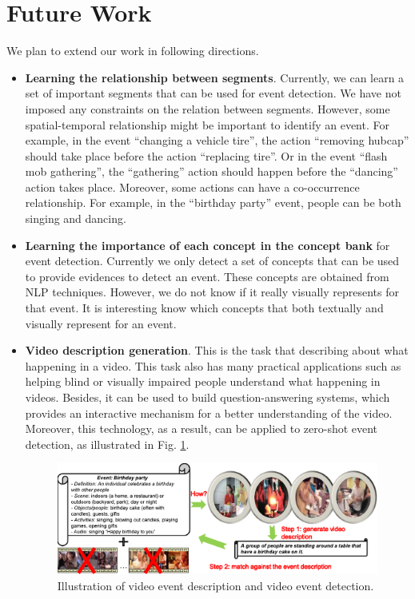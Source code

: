 \section{Future Work}
We plan to extend our work in following directions.
\begin{itemize}
	\item \textbf{Learning the relationship between segments}. Currently, we can learn a set of important segments that can be used for event detection. We have not imposed any constraints on the relation between segments. However, some spatial-temporal relationship might be important to identify an event. For example, in the event ``changing a vehicle tire'', the action ``removing hubcap'' should take place before the action ``replacing tire''. Or in the event ``flash mob gathering'', the ``gathering'' action should happen before the ``dancing'' action takes place. Moreover, some actions can have a co-occurrence relationship. For example, in the ``birthday party'' event, people can be both singing and dancing. 
	\item \textbf{Learning the importance of each concept in the concept bank} for event detection. Currently we only detect a set of concepts that can be used to provide evidences to detect an event. These concepts are obtained from NLP techniques. However, we do not know if it really visually represents for that event. It is interesting know which concepts that both textually and visually represent for an event.
	\item \textbf{Video description generation}. This is the task that describing about what happening in a video. This task also has many practical applications such as helping blind or visually impaired people understand what happening in videos. Besides, it can be used to build question-answering systems, which provides an interactive mechanism for a better understanding of the video. Moreover, this technology, as a result, can be applied to zero-shot event detection, as illustrated in Fig. \ref{c6_zeroshot}.
	
	\begin{figure}
		\centering
		\includegraphics[width=1\textwidth]{zeroshot.pdf}
		\caption{Illustration of video event description and video event detection.}
		\label{c6_zeroshot}
	\end{figure}
\end{itemize}
